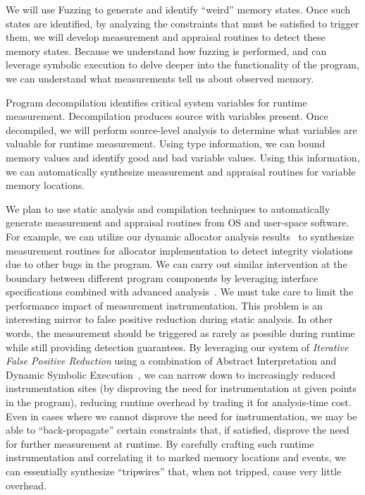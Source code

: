 \documentclass[runningheads]{llncs}
\begin{document}
We will use Fuzzing to generate and identify ``weird'' memory states.  Once such
states are identified, by analyzing the constraints that must be satisfied to
trigger them, we will develop measurement and appraisal routines to detect these
memory states.  Because we understand how fuzzing is performed, and can leverage
symbolic execution to delve deeper into the functionality of the program, we can
understand what measurements tell us about observed memory.

Program decompilation identifies critical system variables for runtime
measurement.  Decompilation produces source with variables present.  Once
decompiled, we will perform source-level analysis to determine what variables
are valuable for runtime measurement.  Using type information, we can bound
memory values and identify good and bad variable values.  Using this
information, we can automatically synthesize measurement and appraisal routines
for variable memory locations.

We plan to use static analysis and compilation techniques to automatically
generate measurement and appraisal routines from OS and user-space software.
For example, we can utilize our dynamic allocator analysis
results~\citep{eckert2018heaphopper} to synthesize measurement routines for
allocator implementation to detect integrity violations due to other bugs in the
program.  We can carry out similar intervention at the boundary between
different program components by leveraging interface specifications combined
with advanced analysis~\citep{dinh2021favocado}.  We must take care to limit the
performance impact of measurement instrumentation.  This problem is an
interesting mirror to false positive reduction during static analysis.  In other
words, the measurement should be triggered as rarely as possible during runtime
while still providing detection guarantees.  By leveraging our system of
\emph{Iterative False Positive Reduction} using a combination of Abstract
Interpretation and Dynamic Symbolic Execution~\citep{vadayath2022arbiter}, we
can narrow down to increasingly reduced instrumentation sites (by disproving the
need for instrumentation at given points in the program), reducing runtime
overhead by trading it for analysis-time cost.  Even in cases where we cannot
disprove the need for instrumentation, we may be able to ``back-propagate''
certain constraints that, if satisfied, disprove the need for further
measurement at runtime.  By carefully crafting such runtime instrumentation and
correlating it to marked memory locations and events, we can essentially
synthesize ``tripwires'' that, when not tripped, cause very little overhead.
\end{document}
